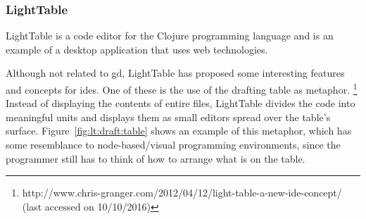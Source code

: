 \begin{comment}


\end{comment}



\subsubsection{LightTable}
\label{lighttable:related}
LightTable\cite{lighttable2015site} is a code editor for the Clojure programming language\cite{hickey2008clojure} and is an example of a desktop application that uses web technologies.

Although not related to \gls{gd}, LightTable has proposed some interesting features and concepts for \glspl{ide}.
One of these is the use of the drafting table as metaphor.%
\footnote{http://www.chris-granger.com/2012/04/12/light-table-a-new-ide-concept/ (last accessed on 10/10/2016)}
Instead of displaying the contents of entire files, LightTable divides the code into meaningful units and displays them as small editors spread over the table's surface.
Figure~\ref{fig:lt:draft:table} shows an example of this metaphor, which has some resemblance to node-based/visual programming environments, since the programmer still has to think of how to arrange what is on the table.

